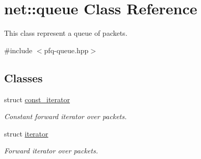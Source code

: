\hypertarget{classnet_1_1queue}{\section{net\-:\-:queue Class Reference}
\label{classnet_1_1queue}
}


This class represent a queue of packets.  




{\ttfamily \#include $<$pfq-\/queue.\-hpp$>$}

\subsection*{Classes}
\begin{DoxyCompactItemize}
\item 
struct \hyperlink{structnet_1_1queue_1_1const__iterator}{const\-\_\-iterator}
\begin{DoxyCompactList}\small\item\em Constant forward iterator over packets. \end{DoxyCompactList}\item 
struct \hyperlink{structnet_1_1queue_1_1iterator}{iterator}
\begin{DoxyCompactList}\small\item\em Forward iterator over packets. \end{DoxyCompactList}\end{DoxyCompactItemize}
